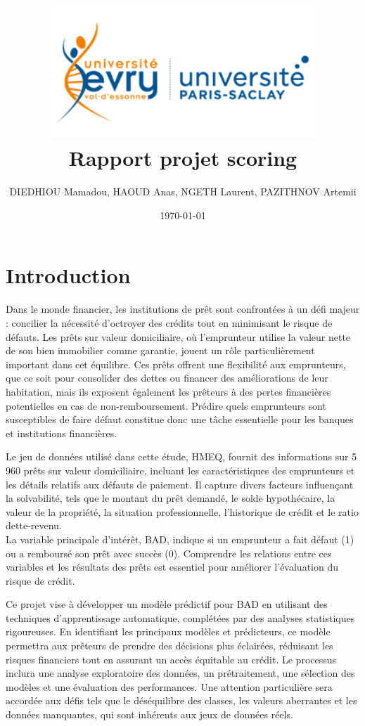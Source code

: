 \documentclass[a4paper,12pt]{report}
\title{
  \includegraphics[width=10cm]{../images/logo-univ-evry} \\[1cm] %
  \textbf{Rapport projet scoring}
}
\author{DIEDHIOU Mamadou, HAOUD Anas, NGETH Laurent, PAZITHNOV Artemii}
\date{\today}
\begin{document}
\maketitle

\tableofcontents
\newpage

\chapter{Introduction}

Dans le monde financier, les institutions de prêt sont confrontées à un défi majeur : concilier la nécessité d'octroyer des crédits tout en minimisant le risque de défauts. 
Les prêts sur valeur domiciliaire, où l'emprunteur utilise la valeur nette de son bien immobilier comme garantie, jouent un rôle particulièrement important dans cet équilibre. 
Ces prêts offrent une flexibilité aux emprunteurs, que ce soit pour consolider des dettes ou financer des améliorations de leur habitation, mais ils exposent également les prêteurs à des pertes 
financières potentielles en cas de non-remboursement. Prédire quels emprunteurs sont susceptibles de faire défaut constitue donc une tâche essentielle pour les banques et institutions financières.

\bigbreak

Le jeu de données utilisé dans cette étude, HMEQ, fournit des informations sur 5 960 prêts sur valeur domiciliaire, incluant les caractéristiques des emprunteurs et les détails relatifs aux défauts de paiement.
Il capture divers facteurs influençant la solvabilité, tels que le montant du prêt demandé, le solde hypothécaire, la valeur de la propriété, la situation professionnelle, l’historique de crédit et le ratio dette-revenu.\\
La variable principale d’intérêt, BAD, indique si un emprunteur a fait défaut (1) ou a remboursé son prêt avec succès (0). 
Comprendre les relations entre ces variables et les résultats des prêts est essentiel pour améliorer l’évaluation du risque de crédit.

\bigbreak

Ce projet vise à développer un modèle prédictif pour BAD en utilisant des techniques d’apprentissage automatique, complétées par des analyses statistiques rigoureuses. 
En identifiant les principaux modèles et prédicteurs, ce modèle permettra aux prêteurs de prendre des décisions plus éclairées, réduisant les risques financiers tout en assurant un accès équitable au crédit. 
Le processus inclura une analyse exploratoire des données, un prétraitement, une sélection des modèles et une évaluation des performances. 
Une attention particulière sera accordée aux défis tels que le déséquilibre des classes, les valeurs aberrantes et les données manquantes, qui sont inhérents aux jeux de données réels.
\end{document}
